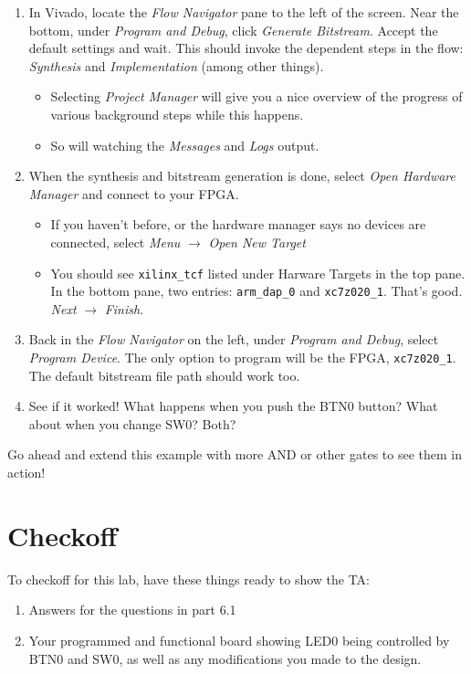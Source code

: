 \documentclass[11pt]{article}
\begin{document}
\begin{enumerate}
  \item In Vivado, locate the \emph{Flow Navigator} pane to the left of the screen. Near the bottom, under \emph{Program and Debug}, click \emph{Generate Bitstream}. Accept the default settings and wait. This should invoke the dependent steps in the flow: \emph{Synthesis} and \emph{Implementation} (among other things).
    \begin{itemize}
      \item Selecting \emph{Project Manager} will give you a nice overview of the progress of various background steps while this happens.
      \item So will watching the \emph{Messages} and \emph{Logs} output.
    \end{itemize}
  \item When the synthesis and bitstream generation is done, select \emph{Open Hardware Manager} and connect to your FPGA.
    \begin{itemize}
      \item If you haven't before, or the hardware manager says no devices are connected, select \emph{Menu} $\rightarrow$ \emph{Open New Target}
      \item You should see \verb|xilinx_tcf| listed under Harware Targets in the top pane. In the bottom pane, two entries: \verb|arm_dap_0| and \verb|xc7z020_1|. That's good. \emph{Next} $\rightarrow$ \emph{Finish}.
    \end{itemize}
  \item Back in the \emph{Flow Navigator} on the left, under \emph{Program and Debug}, select \emph{Program Device}. The only option to program will be the FPGA, \verb|xc7z020_1|. The default bitstream file path should work too.
  \item See if it worked! What happens when you push the BTN0 button? What about when you change SW0? Both?
\end{enumerate}

Go ahead and extend this example with more AND or other gates to see them in action!


\section{Checkoff}
To checkoff for this lab, have these things ready to show the TA:

\begin{enumerate}
	\item Answers for the questions in part 6.1
	\item Your programmed and functional board showing LED0 being controlled by BTN0 and SW0, as well as any modifications you made to the design.
\end{enumerate}
\end{document}

